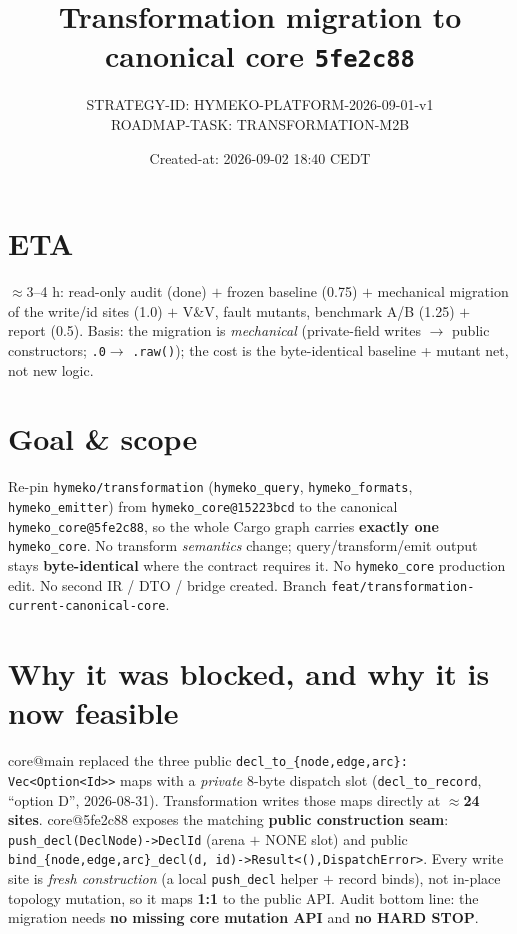 \documentclass[11pt]{article}
\title{Transformation migration to canonical core \texttt{5fe2c88}}
\author{STRATEGY-ID: HYMEKO-PLATFORM-2026-09-01-v1 \\ ROADMAP-TASK: TRANSFORMATION-M2B}
\date{Created-at: 2026-09-02 18:40 CEDT}
\begin{document}
\maketitle

\section*{ETA}
$\approx$3--4 h: read-only audit (done) $+$ frozen baseline (0.75) $+$ mechanical migration of
the write/id sites (1.0) $+$ V\&V, fault mutants, benchmark A/B (1.25) $+$ report (0.5). Basis:
the migration is \emph{mechanical} (private-field writes $\to$ public constructors; \texttt{.0}$\to$
\texttt{.raw()}); the cost is the byte-identical baseline + mutant net, not new logic.

\section{Goal \& scope}
Re-pin \texttt{hymeko/transformation} (\texttt{hymeko\_query}, \texttt{hymeko\_formats},
\texttt{hymeko\_emitter}) from \texttt{hymeko\_core@15223bcd} to the canonical
\texttt{hymeko\_core@5fe2c88}, so the whole Cargo graph carries \textbf{exactly one}
\texttt{hymeko\_core}. No transform \emph{semantics} change; query/transform/emit output stays
\textbf{byte-identical} where the contract requires it. No \texttt{hymeko\_core} production edit.
No second IR / DTO / bridge created. Branch \texttt{feat/transformation-current-canonical-core}.

\section{Why it was blocked, and why it is now feasible}
core@main replaced the three public \texttt{decl\_to\_\{node,edge,arc\}: Vec<Option<Id>>} maps
with a \emph{private} 8-byte dispatch slot (\texttt{decl\_to\_record}, ``option D'', 2026-08-31).
Transformation writes those maps directly at \textbf{$\approx$24 sites}. core@5fe2c88 exposes the
matching \textbf{public construction seam}: \texttt{push\_decl(DeclNode)->DeclId} (arena $+$ NONE
slot) and public \texttt{bind\_\{node,edge,arc\}\_decl(d, id)->Result<(),DispatchError>}. Every
write site is \emph{fresh construction} (a local \texttt{push\_decl} helper $+$ record binds), not
in-place topology mutation, so it maps \textbf{1:1} to the public API. Audit bottom line: the
migration needs \textbf{no missing core mutation API} and \textbf{no HARD STOP}.
\end{document}
